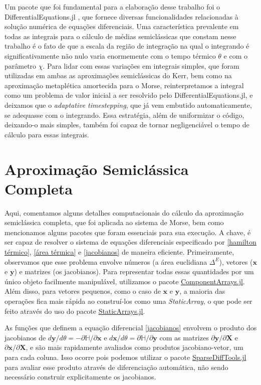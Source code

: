 \documentclass[
	12pt,
	oneside,			%
	a4paper,			%
	english,			%
	brazil				%
	]{abntex2}
\theoremstyle{definition}
\begin{document}
\begin{apendicesenv}
Um pacote que foi fundamental para a elaboração desse trabalho foi o DifferentialEquations.jl \cite{DifferentialEquations.jl-2017}, que fornece diversas funcionalidades relacionadas à solução numérica de equações diferenciais. Uma característica prevalente em todas as integrais para o cálculo de médias semiclássicas que constam nesse trabalho é o fato de que a escala da região de integração na qual o integrando é significativamente não nulo varia enormemente com o tempo térmico $\theta$ e com o parâmetro $\chi$. Para lidar com essas variações em integrais simples, que foram utilizadas em ambas as aproximações semiclássicas do Kerr, bem como na aproximação metaplética amortecida para o Morse, reinterpretamos a integral como um problema de valor inicial a ser resolvido pelo DifferentialEquations.jl, e deixamos que o \textit{adaptative timestepping}, que já vem embutido automaticamente, se adequasse com o integrando. Essa estratégia, além de uniformizar o código, deixando-o mais simples, também foi capaz de tornar negligenciável o tempo de cálculo para essas integrais.

\section{Aproximação Semiclássica Completa}
\label{Aproximação Semiclássica Completa apendice}

Aqui, comentamos alguns detalhes computacionais do cálculo da aproximação semiclássica completa, que foi aplicada ao sistema de Morse, bem como mencionamos alguns pacotes que foram essenciais para sua execução. A chave, é ser capaz de resolver o sistema de equações diferenciais especificado por \eqref{hamilton térmico}, \eqref{área térmica} e \eqref{jacobianos} de maneira eficiente. Primeiramente, observamos que esse problema envolve números (a área euclidiana $\Delta^E$), vetores ($\mathbf{x}$ e $\mathbf{y}$) e matrizes (os jacobianos). Para representar todas essas quantidades por um único objeto facilmente manipulável, utilizamos o pacote \href{https://github.com/jonniedie/ComponentArrays.jl}{ComponentArrays.jl}. Além disso, para vetores pequenos, como o caso de $\mathbf{x}$ e $\mathbf{y}$, a maioria das operações fica mais rápida ao construí-los como uma \textit{StaticArray}, o que pode ser feito através do uso do pacote \href{https://github.com/JuliaArrays/StaticArrays.jl}{StaticArrays.jl}. 

As funções que definem a equação diferencial \eqref{jacobianos} envolvem o produto dos jacobianos de $d\mathbf{y}/d\theta = -\partial\mathbb{H}/\partial \mathbf{x}$ e $d\mathbf{x}/d\theta = \partial\mathbb{H}/\partial \mathbf{y}$ com as matrizes $\partial \mathbf{y}/\partial\mathbf{X}$ e $\partial \mathbf{x}/\partial\mathbf{X}$, e são mais rapidamente avaliados como produtos jacobiano-vetor, um para cada coluna. Isso ocorre pois podemos utilizar o pacote \href{https://github.com/JuliaDiff/SparseDiffTools.jl}{SparseDiffTools.jl} para avaliar esse produto através de diferenciação automática, não sendo necessário construir explicitamente os jacobianos.


\end{apendicesenv}
\end{document}
